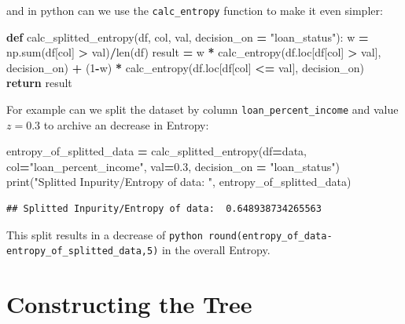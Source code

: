 \documentclass[
]{book}
\newenvironment{Shaded}{\begin{snugshade}}{\end{snugshade}}
\newcommand{\BuiltInTok}[1]{#1}
\newcommand{\ControlFlowTok}[1]{\textcolor[rgb]{0.13,0.29,0.53}{\textbf{#1}}}
\newcommand{\DecValTok}[1]{\textcolor[rgb]{0.00,0.00,0.81}{#1}}
\newcommand{\FloatTok}[1]{\textcolor[rgb]{0.00,0.00,0.81}{#1}}
\newcommand{\KeywordTok}[1]{\textcolor[rgb]{0.13,0.29,0.53}{\textbf{#1}}}
\newcommand{\NormalTok}[1]{#1}
\newcommand{\OperatorTok}[1]{\textcolor[rgb]{0.81,0.36,0.00}{\textbf{#1}}}
\newcommand{\StringTok}[1]{\textcolor[rgb]{0.31,0.60,0.02}{#1}}
\begin{document}
and in python can we use the \texttt{calc\_entropy} function to make it even simpler:

\begin{Shaded}
\begin{Highlighting}[]
\KeywordTok{def}\NormalTok{ calc\_splitted\_entropy(df, col, val, decision\_on }\OperatorTok{=} \StringTok{"loan\_status"}\NormalTok{):}
\NormalTok{  w }\OperatorTok{=}\NormalTok{ np.}\BuiltInTok{sum}\NormalTok{(df[col] }\OperatorTok{\textgreater{}}\NormalTok{ val)}\OperatorTok{/}\BuiltInTok{len}\NormalTok{(df)}
\NormalTok{  result }\OperatorTok{=}\NormalTok{ w }\OperatorTok{*}\NormalTok{ calc\_entropy(df.loc[df[col] }\OperatorTok{\textgreater{}}\NormalTok{ val], decision\_on) }\OperatorTok{+}\NormalTok{ (}\DecValTok{1}\OperatorTok{{-}}\NormalTok{w) }\OperatorTok{*}\NormalTok{ calc\_entropy(df.loc[df[col] }\OperatorTok{\textless{}=}\NormalTok{ val], decision\_on)}
  \ControlFlowTok{return}\NormalTok{ result}
\end{Highlighting}
\end{Shaded}

For example can we split the dataset by column \texttt{loan\_percent\_income} and value \(z=0.3\) to archive an decrease in Entropy:

\begin{Shaded}
\begin{Highlighting}[]
\NormalTok{entropy\_of\_splitted\_data }\OperatorTok{=}\NormalTok{ calc\_splitted\_entropy(df}\OperatorTok{=}\NormalTok{data, col}\OperatorTok{=}\StringTok{"loan\_percent\_income"}\NormalTok{, val}\OperatorTok{=}\FloatTok{0.3}\NormalTok{, decision\_on }\OperatorTok{=} \StringTok{"loan\_status"}\NormalTok{)}
\BuiltInTok{print}\NormalTok{(}\StringTok{"Splitted Inpurity/Entropy of data: "}\NormalTok{, entropy\_of\_splitted\_data)}
\end{Highlighting}
\end{Shaded}

\begin{verbatim}
## Splitted Inpurity/Entropy of data:  0.648938734265563
\end{verbatim}

This split results in a decrease of \texttt{python\ round(entropy\_of\_data-entropy\_of\_splitted\_data,5)} in the overall Entropy.

\hypertarget{constructing-the-tree}{%
\section{Constructing the Tree}\label{constructing-the-tree}}
\end{document}
